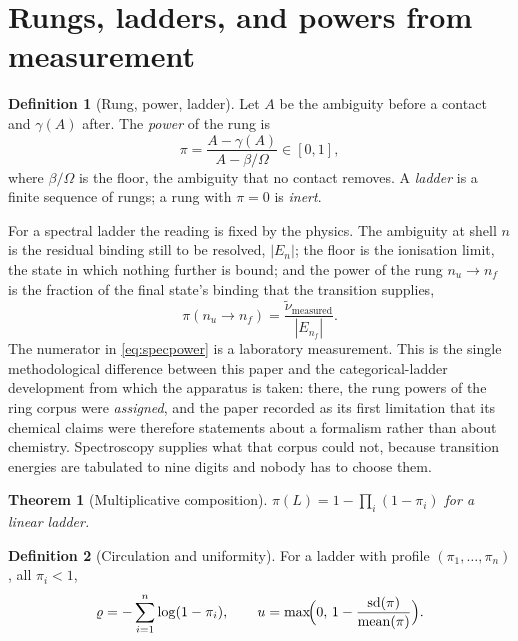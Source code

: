 \documentclass[11pt,a4paper]{article}
\theoremstyle{stmtstyle}
\newtheorem{theorem}{Theorem}
\theoremstyle{definition}
\newtheorem{definition}{Definition}
\theoremstyle{remark}
\newcommand{\flo}{\beta}
\newcommand{\pow}{\pi}
\newcommand{\circu}{\varrho}
\newcommand{\unif}{u}
\newcommand{\Lad}{L}
\begin{document}
\section{Rungs, ladders, and powers from measurement}
\label{sec:ladders}

\begin{definition}[Rung, power, ladder]
\label{def:rung}
Let $A$ be the ambiguity before a contact and $\gamma(A)$ after. The
\emph{power} of the rung is
\begin{equation}
\pow=\frac{A-\gamma(A)}{A-\flo/\Omega}\in[0,1],
\label{eq:power}
\end{equation}
where $\flo/\Omega$ is the floor, the ambiguity that no contact removes. A
\emph{ladder} is a finite sequence of rungs; a rung with $\pow=0$ is
\emph{inert}.
\end{definition}

For a spectral ladder the reading is fixed by the physics. The ambiguity at
shell $n$ is the residual binding still to be resolved, $|E_n|$; the floor
is the ionisation limit, the state in which nothing further is bound; and
the power of the rung $n_u\to n_f$ is the fraction of the final state's
binding that the transition supplies,
\begin{equation}
\pow(n_u\to n_f)=\frac{\tilde\nu_{\text{measured}}}{|E_{n_f}|}.
\label{eq:specpower}
\end{equation}
The numerator in \eqref{eq:specpower} is a laboratory measurement. This is
the single methodological difference between this paper and the
categorical-ladder development from which the apparatus is taken: there,
the rung powers of the ring corpus were \emph{assigned}, and the paper
recorded as its first limitation that its chemical claims were therefore
statements about a formalism rather than about chemistry. Spectroscopy
supplies what that corpus could not, because transition energies are
tabulated to nine digits and nobody has to choose them.

\begin{theorem}[Multiplicative composition]
\label{thm:mult}
$\pow(\Lad)=1-\prod_{i}(1-\pow_i)$ for a linear ladder.
\end{theorem}

\begin{definition}[Circulation and uniformity]
\label{def:invariants}
For a ladder with profile $(\pow_1,\dots,\pow_n)$, all $\pow_i<1$,
\begin{equation}
\circu=-\sum_{i=1}^{n}\log(1-\pow_i),
\qquad
\unif=\max\!\Bigl(0,\,1-\frac{\operatorname{sd}(\pow)}{\operatorname{mean}(\pow)}\Bigr).
\label{eq:invariants}
\end{equation}
\end{definition}
\end{document}
